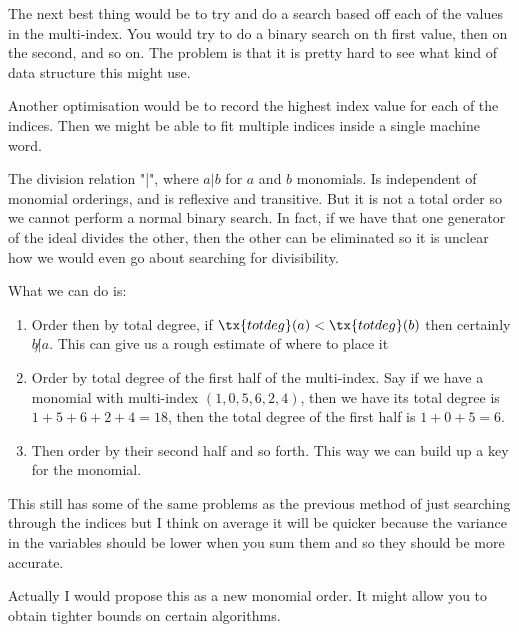 The next best thing would be to try and do a search based off each of the values in the multi-index. You would try to do a binary search on th first value, then on the second, and so on. The problem is that it is pretty hard to see what kind of data structure this might use.

Another optimisation would be to record the highest index value for each of the indices. Then we might be able to fit multiple indices inside a single machine word.

The division relation "|", where $a | b$ for $a$ and $b$ monomials. Is independent of monomial orderings, and is reflexive and transitive. But it is not a total order so we cannot perform a normal binary search. In fact, if we have that one generator of the ideal divides the other, then the other can be eliminated so it is unclear how we would even go about searching for divisibility.

What we can do is:
\begin{enumerate}
  \item Order then by total degree, if $\tx{totdeg}(a) < \tx{totdeg}(b)$ then certainly $b \not | a$. This can give us a rough estimate of where to place it
  \item Order by total degree of the first half of the multi-index. Say if we have a monomial with multi-index $(1, 0, 5, 6, 2, 4)$, then we have its total degree is $1 + 5 + 6 + 2 + 4 = 18$, then the total degree of the first half is $1 + 0 + 5 = 6$.
  \item Then order by their second half and so forth. This way we can build up a key for the monomial.
\end{enumerate}

This still has some of the same problems as the previous method of just searching through the indices but I think on average it will be quicker because the variance in the variables should be lower when you sum them and so they should be more accurate.

Actually I would propose this as a new monomial order. It might allow you to obtain tighter bounds on certain algorithms.

